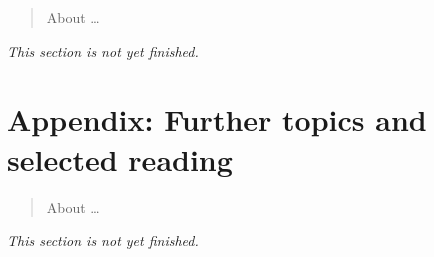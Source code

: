 \documentclass[fleqn,a4paper]{article}
\newenvironment{todo}{\color{primary}\emph{This section is not yet finished.}}{}
\let\oldsection\section
\renewcommand\section{\clearpage\oldsection}
\theoremstyle{definition}
\theoremstyle{definition}
\theoremstyle{definition}
\theoremstyle{definition}
\theoremstyle{remark}
\begin{document}
\begin{quote}
About \ldots{}
\end{quote}

\begin{todo}

\end{todo}

\hypertarget{further-reading}{%
\section*{\texorpdfstring{\textbf{Appendix:} Further topics and selected reading}{Appendix: Further topics and selected reading}}\label{further-reading}}

\begin{quote}
About \ldots{}
\end{quote}

\begin{todo}

\end{todo}
\end{document}
